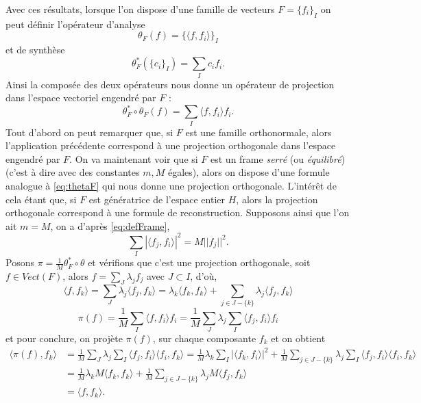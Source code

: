 Avec ces résultats, lorsque l'on dispose d'une famille de vecteurs $F = \{f_i\}_I$ on peut définir l'opérateur d'analyse
\begin{equation*}
	\theta_F (f) = \{\langle f, f_i \rangle\}_I 
\end{equation*}
et de synthèse
\begin{equation*}
	\theta^*_F( \{c_i\}_I) = \sum_I c_i f_i.  
\end{equation*}
Ainsi la composée des deux opérateurs nous donne un opérateur de projection dans l'espace vectoriel engendré par $F$ :
\begin{equation}\label{eq:thetaF}
	\theta^*_F \circ \theta_F (f) = \sum_I \langle f, f_i\rangle f_i. 
\end{equation}
Tout d'abord on peut remarquer que, si $F$ est une famille orthonormale, alors l'application précédente correspond à une projection orthogonale dans l'espace engendré par $F$.
On va maintenant voir que si $F$ est un frame \textit{serré} (ou \textit{équilibré}) (c'est à dire avec des constantes $m, M$ égales), alors on dispose d'une formule analogue à \ref{eq:thetaF} qui nous donne une projection orthogonale.
L'intérêt de cela étant que, si $F$ est génératrice de l'espace entier $H$, alors la projection orthogonale correspond à une formule de reconstruction.
\newline
Supposons ainsi que l'on ait $m =M$, on a d'après \ref{eq:defFrame}, 
\begin{equation*}
	\sum_I |\langle f_j, f_i \rangle |^2 = M||f_j||^2.
\end{equation*}
Posons $\pi = \frac{1}{M}\theta^*_F \circ \theta$ et vérifions que c'est une projection orthogonale, soit $f\in Vect(F)$, alors
$f = \sum_J \lambda_j f_j$ avec $J\subset I$, d'où,
\begin{equation*}
	\langle f, f_k \rangle = \sum_J \lambda_j \langle f_j, f_k \rangle = \lambda_k \langle f_k, f_k \rangle + \sum_{j \in J-\{k\}} \lambda_j \langle f_j, f_k \rangle  
\end{equation*}
\begin{equation*}
	\pi(f) = \frac{1}{M}\sum_I \langle f, f_i \rangle f_i 
	= \frac{1}{M}\sum_J \lambda_j \sum_I \langle f_j, f_i \rangle f_i  
\end{equation*}
et pour conclure, on projète $\pi(f)$, sur chaque composante $f_k$ et on obtient
\begin{align*}
	\langle \pi(f), f_k \rangle &= \frac{1}{M} \sum_J \lambda_j \sum_I \langle f_j, f_i \rangle \langle f_i, f_k \rangle 
	= \frac{1}{M}  \lambda_k \sum_I |\langle f_k, f_i\rangle|^2 + \frac{1}{M} \sum_{j \in J-\{k\}}\lambda_j \sum_I  \langle f_j, f_i \rangle \langle f_i, f_k \rangle \\
	&= \frac{1}{M} \lambda_k M \langle f_k, f_k \rangle + \frac{1}{M} \sum_{j \in J-\{k\}} \lambda_j M\langle f_j, f_k \rangle \\
	&= \langle f, f_k \rangle.
\end{align*}
